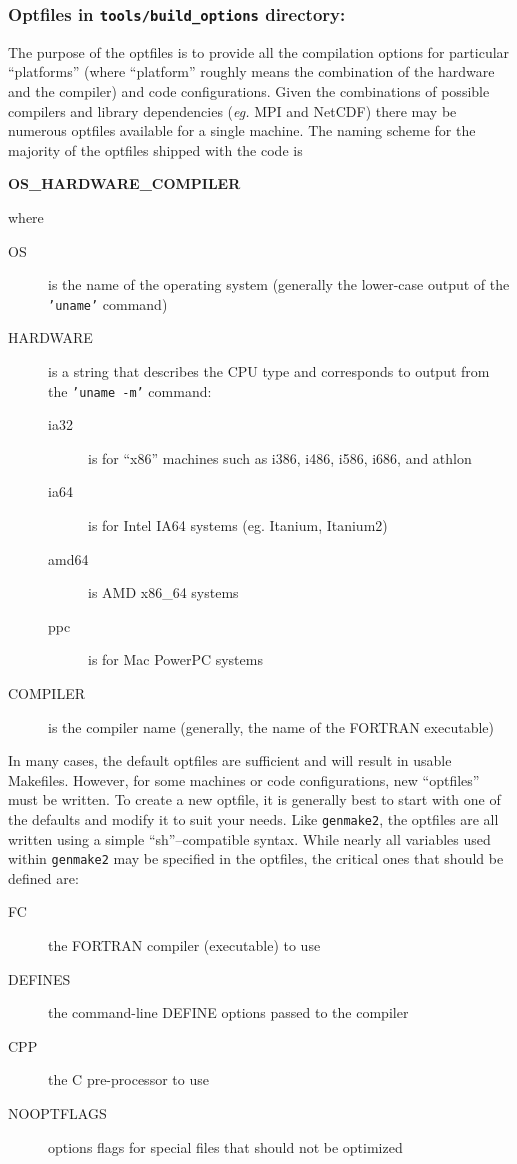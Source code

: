 \subsubsection{Optfiles in \texttt{tools/build\_options} directory:}

The purpose of the optfiles is to provide all the compilation options
for particular ``platforms'' (where ``platform'' roughly means the
combination of the hardware and the compiler) and code configurations.
Given the combinations of possible compilers and library dependencies
({\it eg.}  MPI and NetCDF) there may be numerous optfiles available
for a single machine.  The naming scheme for the majority of the
optfiles shipped with the code is
\begin{center}
  {\bf OS\_HARDWARE\_COMPILER }
\end{center}
where
\begin{description}
\item[OS] is the name of the operating system (generally the
  lower-case output of the {\tt 'uname'} command)
\item[HARDWARE] is a string that describes the CPU type and
  corresponds to output from the  {\tt 'uname -m'} command:
  \begin{description}
  \item[ia32] is for ``x86'' machines such as i386, i486, i586, i686,
    and athlon
  \item[ia64] is for Intel IA64 systems (eg. Itanium, Itanium2)
  \item[amd64] is AMD x86\_64 systems
  \item[ppc] is for Mac PowerPC systems
  \end{description}
\item[COMPILER] is the compiler name (generally, the name of the
  FORTRAN executable)
\end{description}

In many cases, the default optfiles are sufficient and will result in
usable Makefiles.  However, for some machines or code configurations,
new ``optfiles'' must be written. To create a new optfile, it is
generally best to start with one of the defaults and modify it to suit
your needs.  Like \texttt{genmake2}, the optfiles are all written
using a simple ``sh''--compatible syntax.  While nearly all variables
used within \texttt{genmake2} may be specified in the optfiles, the
critical ones that should be defined are:

\begin{description}
\item[FC] the FORTRAN compiler (executable) to use
\item[DEFINES] the command-line DEFINE options passed to the compiler
\item[CPP] the C pre-processor to use
\item[NOOPTFLAGS] options flags for special files that should not be
  optimized
\end{description}

